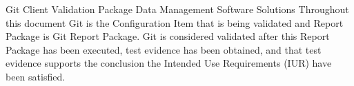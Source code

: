 \documentclass[10pt]{tlc-article}
\begin{document}
  \global\def\configurationitem{Git}

  \tlcTitlePageAndTableOfContents
    {Git Client Validation Package}
    {Data Management Software Solutions}
    {Throughout this document Git is the Configuration Item that is being
     validated and Report Package is Git Report Package.  Git is
     considered validated after this Report Package has been executed, test
     evidence has been obtained, and that test evidence supports the conclusion
     the Intended Use Requirements (IUR) have been satisfied.}

  
\end{document}

